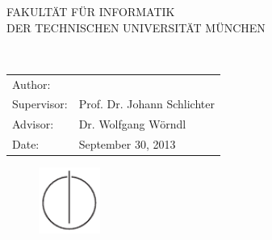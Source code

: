 


\def\bcorcor{0.15cm}
\addtolength{\hoffset}{\bcorcor}

\thispagestyle{empty}

 \vspace{10mm}
\begin{center}
	       \oTUM{4cm}

	   \vspace{5mm}
	   \huge FAKULTÄT FÜR INFORMATIK\\
	   \vspace{0.5cm}
	 \large DER TECHNISCHEN UNIVERSITÄT MÜNCHEN\\

	\end{center}


\vspace{5mm}
\begin{center}

   {\Large \doctype}

  \vspace{5mm}


  \vspace{5mm}

  \begin{spacing}{2}
    {\LARGE \titleGer}\\
  \end{spacing}

  \vspace{15mm}

    \begin{tabular}{ll}
	   \Large Author:     & \Large \author \\[2mm]
	   \Large Supervisor:    & \Large Prof. Dr. Johann Schlichter \\[2mm]
	   \Large Advisor:	& \Large Dr. Wolfgang Wörndl \\[2mm]
	   \Large Date:       & \Large September 30, 2013
	 \end{tabular}

	 \vspace{5mm}

	 \begin{figure}[h!]
  \centering
   \includegraphics[width=2cm]{styles/in_tum_logo.pdf}
  \end{figure}


\end{center}

\addtolength{\hoffset}{\bcorcor}
